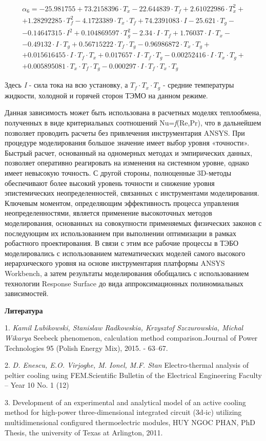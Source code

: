 \[\begin{array}{l} {\alpha _{6} =-25.981755+73.2158396\cdot T_{x} -22.644839\cdot T_{f} +2.61022986\cdot T_{x}^{2} +} \\ {+1.28292285\cdot T_{f}^{2} -4.1723389\cdot T_{x} \cdot T_{f} +74.2391083\cdot I-25.621\cdot T_{g} -} \\ {-0.14647315\cdot I^{2} +0.104869597\cdot T_{g}^{2} -2.34\cdot I\cdot T_{f} +1.76037\cdot I\cdot T_{x} -} \\ {-0.49132\cdot I\cdot T_{g} +0.56715222\cdot T_{f} \cdot T_{g} -0.96986872\cdot T_{x} \cdot T_{g} +} \\ {+0.015616455\cdot I\cdot T_{f} \cdot T_{x} +0.017657\cdot I\cdot T_{f} \cdot T_{g} -0.00252416\cdot I\cdot T_{x} \cdot T_{g} +} \\ {+0.005895081\cdot T_{x} \cdot T_{f} \cdot T_{g} -0.000297\cdot I\cdot T_{f} \cdot T_{x} \cdot T_{g} } \end{array}\]

Здесь \textit{I} - сила тока на всю установку, а $T_{f} \cdot T_{x} \cdot T_{g} $ - средние температуры жидкости, холодной и горячей сторон ТЭМО на данном режиме.

Данная зависимость может быть использована в расчетных моделях теплообмена, полученных в виде критериальных соотношений Nu=\textit{f}(Re,Pr), что в дальнейшем позволяет проводить расчеты без привлечения инструментария ANSYS. При процедуре моделирования большое значение имеет выбор уровня «точности». Быстрый расчет, основанный на одномерных методах и эмпирических данных, позволяет оперативно реагировать на изменения на системном уровне, однако имеет невысокую точность. С другой стороны, полноценные 3D-методы обеспечивают более высокий уровень точности и снижение уровня эпистемических неопределенностей, связанных с инструментами моделирования. Ключевым моментом, определяющим эффективность процесса управления неопределенностями, является применение высокоточных методов моделирования, основанных на совокупности применяемых физических законов с последующим их использованием при выполнении оптимизации в рамках робастного проектирования. В связи с этим все рабочие процессы в ТЭБО моделировались с использованием математических моделей самого высокого иерархического уровня на основе инструментария платформы ANSYS Workbench, а затем результаты моделирования обобщались с использованием технологии Response Surface до вида аппроксимационных полиномиальных зависимостей.

\smallskip \centerline{\bf Литература}\nopagebreak

1. {\it Kamil Lubikowski, Stanislaw Radkowskia, Krzysztof Szczurowskia, Michal Wikarya} Seebeck phenomenon, calculation method comparison.Journal of Power Technologies 95 (Polish Energy Mix), 2015. - 63–67.

2. {\it D. Enescu, E.O. Virjoghe, M. Ionel, M.F. Stan} Electro-thermal analysis of peltier cooling using FEM.Scientific Bulletin of the Electrical Engineering Faculty – Year 10 No. 1 (12)

3. Development of an experimental and analytical model of an active cooling method for high-power three-dimensional integrated circuit (3d-ic) utilizing multidimensional configured thermoelectric modules, HUY NGOC PHAN, PhD Thesis, the university of Texas at Arlington, 2011.
